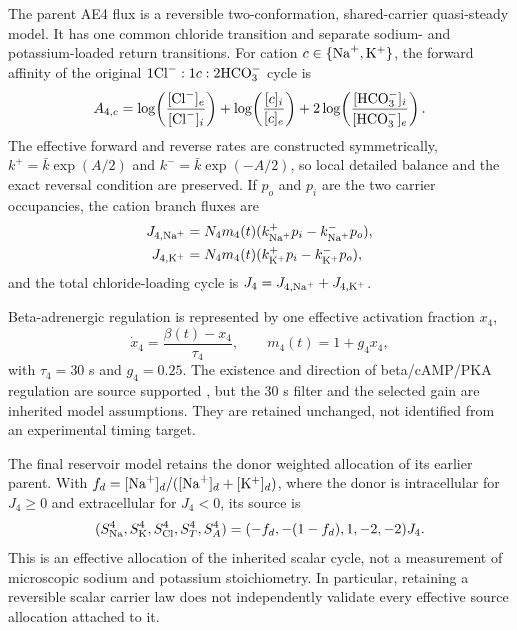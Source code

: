 The parent AE4 flux is a reversible two-conformation, shared-carrier quasi-steady model. It has one common chloride transition and separate sodium- and potassium-loaded return transitions. For cation $c\in\{\mathrm{Na}^{+},\mathrm{K}^{+}\}$, the forward affinity of the original $1\mathrm{Cl}^{-}:1c:2\mathrm{HCO}_{3}^{-}$ cycle is
\begin{equation}
    A_{4,c}=\log\!\left(\frac{[\mathrm{Cl}^{-}]_e}{[\mathrm{Cl}^{-}]_i}\right)
           +\log\!\left(\frac{[c]_i}{[c]_e}\right)
           +2\log\!\left(\frac{[\mathrm{HCO}_{3}^{-}]_i}{[\mathrm{HCO}_{3}^{-}]_e}\right).
    \label{eq:ae4-affinity}
\end{equation}
The effective forward and reverse rates are constructed symmetrically, $k^+=\bar k\exp(A/2)$ and $k^-=\bar k\exp(-A/2)$, so local detailed balance and the exact reversal condition are preserved. If $p_o$ and $p_i$ are the two carrier occupancies, the cation branch fluxes are
\begin{align*}
    J_{4,\mathrm{Na}^{+}}&=N_4m_4(t)(k_{\mathrm{Na}^{+}}^{+}p_i-k_{\mathrm{Na}^{+}}^{-}p_o),\\
    J_{4,\mathrm{K}^{+}}&=N_4m_4(t)(k_{\mathrm{K}^{+}}^{+}p_i-k_{\mathrm{K}^{+}}^{-}p_o),
\end{align*}
and the total chloride-loading cycle is $J_4=J_{4,\mathrm{Na}^{+}}+J_{4,\mathrm{K}^{+}}$.

Beta-adrenergic regulation is represented by one effective activation fraction $x_4$,
\begin{equation}
    \dot x_4=\frac{\beta(t)-x_4}{\tau_4},
    \qquad m_4(t)=1+g_4x_4,
    \label{eq:ae4-regulation}
\end{equation}
with $\tau_4=30$ s and $g_4=0.25$. The existence and direction of beta/cAMP/PKA regulation are source supported \citep{Pena2021}, but the 30 s filter and the selected gain are inherited model assumptions. They are retained unchanged, not identified from an experimental timing target.

The final reservoir model retains the donor weighted allocation of its earlier parent. With $f_d=[\mathrm{Na}^{+}]_d/([\mathrm{Na}^{+}]_d+[\mathrm{K}^{+}]_d)$, where the donor is intracellular for $J_4\geq0$ and extracellular for $J_4<0$, its source is
\begin{equation}
 (S^4_{\rm Na},S^4_{\rm K},S^4_{\rm Cl},S^4_T,S^4_A)
 =(-f_d,-(1-f_d),1,-2,-2)J_4.
 \label{eq:donor-routing}
\end{equation}
This is an effective allocation of the inherited scalar cycle, not a measurement of microscopic sodium and potassium stoichiometry. In particular, retaining a reversible scalar carrier law does not independently validate every effective source allocation attached to it.

